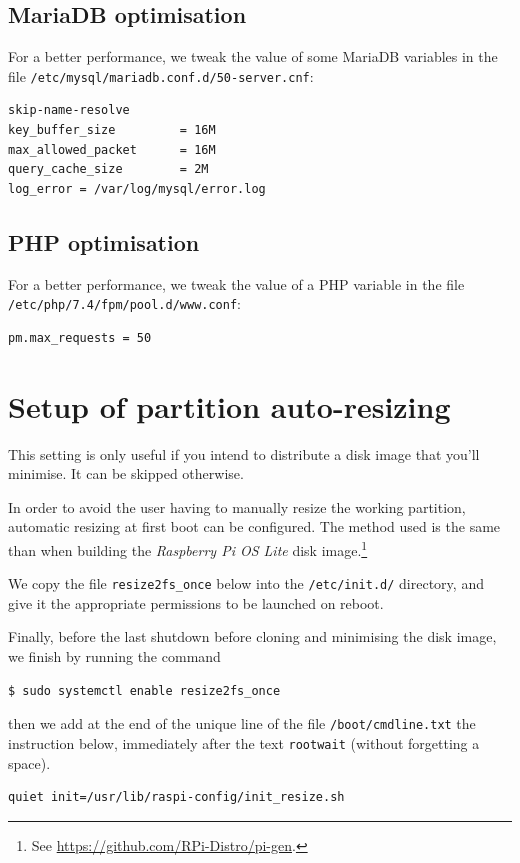 \documentclass[12pt]{article}
\begin{document}

\subsection{MariaDB optimisation}

For a better performance, we tweak the value of some MariaDB variables in the file \lstinline{/etc/mysql/mariadb.conf.d/50-server.cnf}:
\begin{lstlisting}[language=bash]
skip-name-resolve
key_buffer_size         = 16M
max_allowed_packet      = 16M
query_cache_size        = 2M
log_error = /var/log/mysql/error.log
\end{lstlisting}

\subsection{PHP optimisation}

For a better performance, we tweak the value of a PHP variable in the file \lstinline{/etc/php/7.4/fpm/pool.d/www.conf}:
\begin{lstlisting}[language=bash]
pm.max_requests = 50
\end{lstlisting}

\section{Setup of partition auto-resizing}

This setting is only useful if you intend to distribute a disk image that you'll minimise.
It can be skipped otherwise.

In order to avoid the user having to manually resize the working partition, automatic resizing at first boot can be configured.
The method used is the same than when building the \emph{Raspberry Pi OS Lite} disk image.\footnote{See \url{https://github.com/RPi-Distro/pi-gen}.}

We copy the file \lstinline{resize2fs_once} below into the \lstinline{/etc/init.d/} directory, and give it the appropriate permissions to be launched on reboot.


Finally, before the last shutdown before cloning and minimising the disk image, we finish by running the command
\begin{lstlisting}[language=bash]
$ sudo systemctl enable resize2fs_once
\end{lstlisting}
then we add at the end of the unique line of the file \lstinline{/boot/cmdline.txt} the instruction below, immediately after the text \lstinline{rootwait} (without forgetting a space).
\begin{lstlisting}[language=bash]
quiet init=/usr/lib/raspi-config/init_resize.sh
\end{lstlisting}
\end{document}
